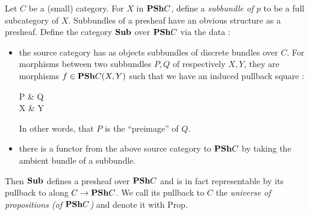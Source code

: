 \documentclass{article}
\begin{document}
\begin{prop}

  Let $C$ be a (small) category.
  For $X$ in $\mathbf{PSh} C$,
  define a \emph{subbundle of $p$} to be a full subcategory of $X$.
  Subbundles of a presheaf have an obvious structure as a presheaf.
  Define the category $\mathbf{Sub}$ over $\mathbf{PSh} C$ via the data :
  \begin{itemize}
    \item the source category has as objects 
    subbundles of discrete bundles over $ C$.
    For morphisms between two subbundles $P, Q$ of 
    respectively $X, Y$,
    they are morphisms $f \in \mathbf{PSh} C(X,Y)$ such that
    we have an induced pullback square : 
    \begin{cd}
      P & Q \\
      X & Y
      \arrow[from=2-1, to=2-2, "f"{swap}]
      \arrow[from=1-1, to=2-1]
      \arrow[from=1-1, to=1-2]
      \arrow[from=1-2, to=2-2]
      \arrow["\lrcorner"{anchor=center, pos=0.125}, draw=none, from=1-1, to=2-2]
    \end{cd}
    In other words, that $P$ is the ``preimage'' of $Q$.
    \item there is a functor from the above source category to $\mathbf{PSh} C$
    by taking the ambient bundle of a subbundle.
  \end{itemize} 
  Then $\mathbf{Sub}$ defines a presheaf over $\mathbf{PSh} C$ and is in fact
  representable by its pullback to along $ C \to \mathbf{PSh} C$.
  We call its pullback to $C$ the 
  \emph{universe of propositions (of $\mathbf{PSh} C$)}
  and denote it with $\mathrm{Prop}$.
\end{prop}
\end{document}
